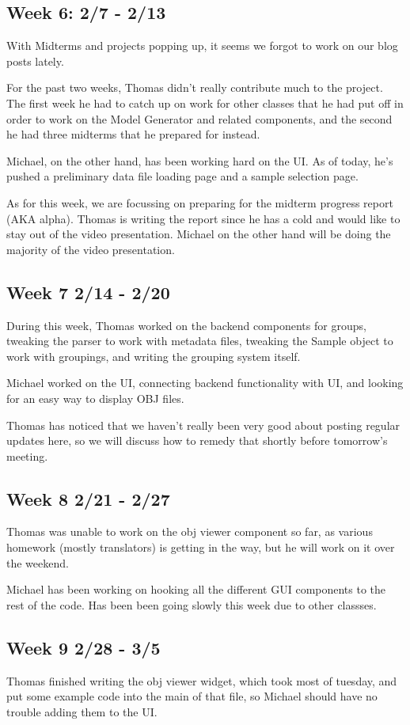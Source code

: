 \documentclass[letterpaper,10pt, onecolumn, draftclsnofoot]{IEEEtran}
\begin{document}
\subsection{Week 6: 2/7 - 2/13}
With Midterms and projects popping up, it seems we forgot to work on our blog posts lately.

For the past two weeks, Thomas didn't really contribute much to the project. The first week he had to catch up on work for other classes that he had put off in order to work on the Model Generator and related components, and the second he had three midterms that he prepared for instead.

Michael, on the other hand, has been working hard on the UI. As of today, he's pushed a preliminary data file loading page and a sample selection page. 

As for this week, we are focussing on preparing for the midterm progress report (AKA alpha). Thomas is writing the report since he has a cold and would like to stay out of the video presentation. Michael on the other hand will be doing the majority of the video presentation.

\subsection{Week 7 2/14 - 2/20}
During this week, Thomas worked on the backend components for groups, tweaking the parser to work with metadata files, tweaking the Sample object to work with groupings, and writing the grouping system itself.

Michael worked on the UI, connecting backend functionality with UI, and looking for an easy way to display OBJ files.

Thomas has noticed that we haven't really been very good about posting regular updates here, so we will discuss how to remedy that shortly before tomorrow's meeting.

\subsection{Week 8 2/21 - 2/27}
Thomas was unable to work on the obj viewer component so far, as various homework (mostly translators) is getting in the way, but he will work on it over the weekend.

Michael has been working on hooking all the different GUI components to the rest of the code. Has been been going slowly this week due to other classses. 

\subsection{Week 9 2/28 - 3/5}
Thomas finished writing the obj viewer widget, which took most of tuesday, and put some example code into the main of that file, so Michael should have no trouble adding them to the UI.
\end{document}
